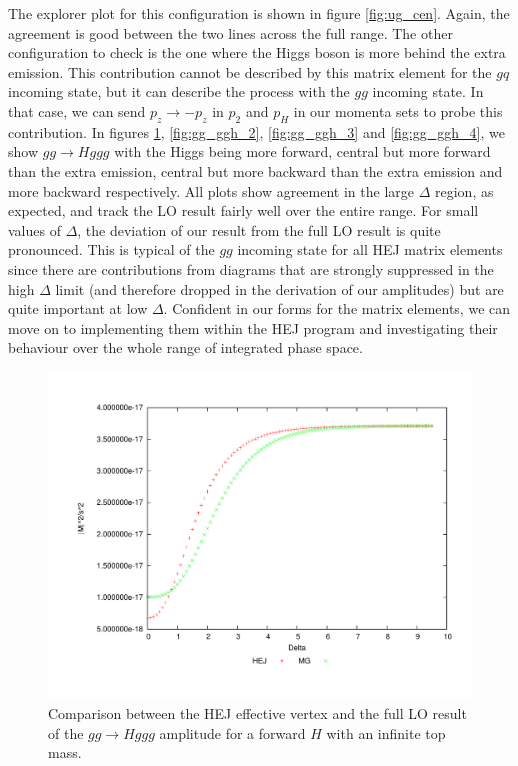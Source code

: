 The explorer plot for this configuration is shown in figure \ref{fig:ug_cen}. Again, the agreement is good between the two lines across the full range. The other configuration to check is the one where the Higgs boson is more behind the extra emission. This contribution cannot be described by this matrix element for the $gq$ incoming state, but it can describe the process with the $gg$ incoming state.  In that case, we can send $p_z \to -p_z$ in $p_2$ and $p_H$ in our momenta sets to probe this contribution. In figures \ref{fig:gg_ggh_1}, \ref{fig:gg_ggh_2}, \ref{fig:gg_ggh_3} and \ref{fig:gg_ggh_4}, we show $gg \to Hggg$ with the Higgs being more forward, central but more forward than the extra emission, central but more backward than the extra emission and more backward respectively. All plots show agreement in the large $\Delta$ region, as expected, and track the LO result fairly well over the entire range. For small values of $\Delta$, the deviation of our result from the full LO result is quite pronounced. This is typical of the $gg$ incoming state for all HEJ matrix elements \cite{Andersen2009a} since there are contributions from diagrams that are strongly suppressed in the high $\Delta$ limit (and therefore dropped in the derivation of our amplitudes) but are quite important at low $\Delta$. Confident in our forms for the matrix elements, we can move on to implementing them within the HEJ program and investigating their behaviour over the whole range of integrated phase space.

\begin{figure}[t]
\centering
\includegraphics[scale=0.47]{Images/gg_nextfor.pdf}
\caption{Comparison between the HEJ effective vertex and the full LO result of the $gg \to Hggg$ amplitude for a forward $H$ with an infinite top mass.}
\label{fig:gg_ggh_1}
\end{figure}

